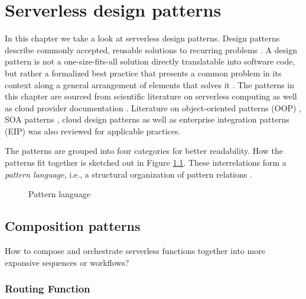 \chapter{Serverless design patterns} \label{cha:patterns}

In this chapter we take a look at serverless design patterns. Design patterns describe commonly accepted, reusable solutions to recurring problems \parencite{hohpe2004enterprise}. A design pattern is not a one-size-fits-all solution directly translatable into software code, but rather a formalized best practice that presents a common problem in its context along a general arrangement of elements that solves it \parencite{gamma94designPatterns}. The patterns in this chapter are sourced from scientific literature on serverless computing as well as cloud provider documentation \parencite[][]{aws18serverlessLens, microsoft18cloudPatterns}. Literature on object-oriented patterns (OOP) \parencite{gamma94designPatterns}, SOA patterns \parencite{rotem12soa}, cloud design patterns \parencite{microsoft18cloudPatterns} as well as enterprise integration patterns (EIP) \parencite{hohpe2004enterprise} was also reviewed for applicable practices.

The patterns are grouped into four categories for better readability. How the patterns fit together is sketched out in Figure \ref{fig:patternLanguage}. These interrelations form a \textit{pattern language}, i.e., a structural organization of pattern relations \parencite{rotem12soa}.

\begin{figure}[h]
  \begin{center}
  \end{center}
  \caption{Pattern language}
  \label{fig:patternLanguage}
\end{figure}

\section{Composition patterns} \label{sec:compositionPatterns}

How to compose and orchestrate serverless functions together into more expansive sequences or workflows?

\subsection{Routing Function} \label{subsec:routingFunction}

